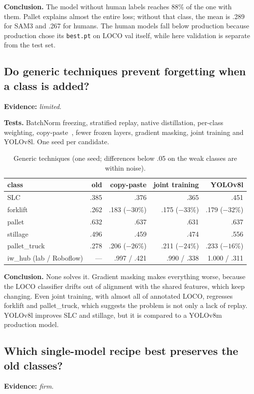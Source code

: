 \documentclass[11pt,a4paper]{article}
\newcommand{\evidence}[1]{\noindent\textbf{Evidence:} \emph{#1}.\par}
\newcommand{\tests}{\noindent\textbf{Tests.} }
\newcommand{\conclusion}{\noindent\textbf{Conclusion.} }
\begin{document}
\conclusion The model without human labels reaches 88\% of the one with them.
Pallet explains almost the entire loss; without that class, the mean is .289 for
SAM3 and .267 for humans. The human models fall below production because
production chose its \texttt{best.pt} on LOCO val itself, while here validation is
separate from the test set.

\subsection{Do generic techniques prevent forgetting when a class is added?}
\evidence{limited}

\tests BatchNorm freezing, stratified replay, native distillation, per-class
weighting, copy-paste~\cite{copypaste}, fewer frozen layers, gradient masking,
joint training and YOLOv8l. One seed per candidate.

\begin{table}[H]
\centering\small
\caption{Generic techniques (one seed; differences below .05 on the weak classes
are within noise).}
\begin{tabular}{lrrrr}
\toprule
class & old & copy-paste & joint training & YOLOv8l \\
\midrule
SLC & .385 & .376 & .365 & .451 \\
forklift & .262 & .183 ($-30\%$) & .175 ($-33\%$) & .179 ($-32\%$) \\
pallet & .632 & .637 & .631 & .637 \\
stillage & .496 & .459 & .474 & .556 \\
pallet\_truck & .278 & .206 ($-26\%$) & .211 ($-24\%$) & .233 ($-16\%$) \\
iw\_hub (lab / Roboflow) & --- & .997 / .421 & .990 / .338 & 1.000 / .311 \\
\bottomrule
\end{tabular}
\end{table}

\conclusion None solves it. Gradient masking makes everything worse, because the
LOCO classifier drifts out of alignment with the shared features, which keep
changing. Even joint training, with almost all of annotated LOCO, regresses
forklift and pallet\_truck, which suggests the problem is not only a lack of
replay. YOLOv8l improves SLC and stillage, but it is compared to a YOLOv8m
production model.

\subsection{Which single-model recipe best preserves the old classes?}
\evidence{firm}
\end{document}
